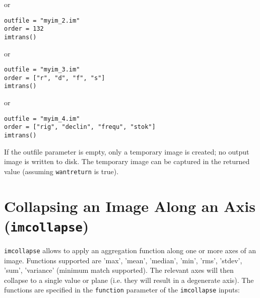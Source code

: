 or
\begin{verbatim}
outfile = "myim_2.im"
order = 132
imtrans()
\end{verbatim}

or
\begin{verbatim}
outfile = "myim_3.im"
order = ["r", "d", "f", "s"]
imtrans()
\end{verbatim}

or

\begin{verbatim}
outfile = "myim_4.im"
order = ["rig", "declin", "frequ", "stok"]
imtrans()
\end{verbatim}



If the outfile parameter is empty, only a temporary image is created; no output image
is written to disk. The temporary image can be captured in the returned value (assuming
{\tt wantreturn} is true).

\section{Collapsing an Image Along an Axis ({\tt imcollapse})}
\label{section:analysis.imcollapse}

{\tt imcollapse} allows to apply an aggregation function along one or
more axes of an image. Functions supported are 'max', 'mean',
'median', 'min', 'rms', 'stdev', 'sum', 'variance' (minimum match
supported). The relevant axes will then collapse to a single value or
plane (i.e. they will result in a degenerate axis). The functions are
specified in the {\tt function} parameter of the {\tt imcollapse}
inputs:

